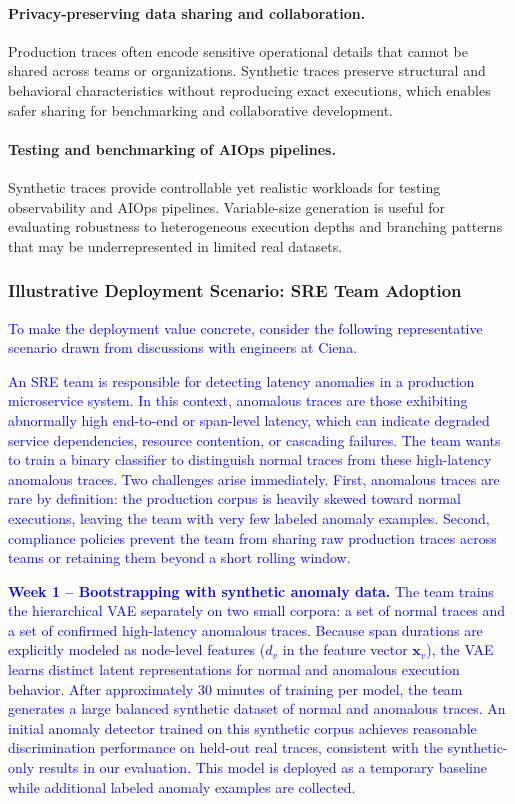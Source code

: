 \documentclass[sigconf,review]{acmart}
\begin{document}
\paragraph{Privacy-preserving data sharing and collaboration.}
Production traces often encode sensitive operational details that cannot be shared across teams or organizations. Synthetic traces preserve structural and behavioral characteristics without reproducing exact executions, which enables safer sharing for benchmarking and collaborative development.

\paragraph{Testing and benchmarking of AIOps pipelines.}
Synthetic traces provide controllable yet realistic workloads for testing observability and AIOps pipelines. Variable-size generation is useful for evaluating robustness to heterogeneous execution depths and branching patterns that may be underrepresented in limited real datasets.

\subsubsection{Illustrative Deployment Scenario: SRE Team Adoption}
\label{sec:sre_scenario}

\textcolor{blue}{To make the deployment value concrete, consider the following representative scenario drawn from discussions with engineers at Ciena.}

\textcolor{blue}{An SRE team is responsible for detecting latency anomalies in a production microservice system. In this context, anomalous traces are those exhibiting abnormally high end-to-end or span-level latency, which can indicate degraded service dependencies, resource contention, or cascading failures. The team wants to train a binary classifier to distinguish normal traces from these high-latency anomalous traces. Two challenges arise immediately. First, anomalous traces are rare by definition: the production corpus is heavily skewed toward normal executions, leaving the team with very few labeled anomaly examples. Second, compliance policies prevent the team from sharing raw production traces across teams or retaining them beyond a short rolling window.}

\textcolor{blue}{\textbf{Week 1 -- Bootstrapping with synthetic anomaly data.} The team trains the hierarchical VAE separately on two small corpora: a set of normal traces and a set of confirmed high-latency anomalous traces. Because span durations are explicitly modeled as node-level features ($d_v$ in the feature vector $\mathbf{x}_v$), the VAE learns distinct latent representations for normal and anomalous execution behavior. After approximately 30 minutes of training per model, the team generates a large balanced synthetic dataset of normal and anomalous traces. An initial anomaly detector trained on this synthetic corpus achieves reasonable discrimination performance on held-out real traces, consistent with the synthetic-only results in our evaluation. This model is deployed as a temporary baseline while additional labeled anomaly examples are collected.}
\end{document}
